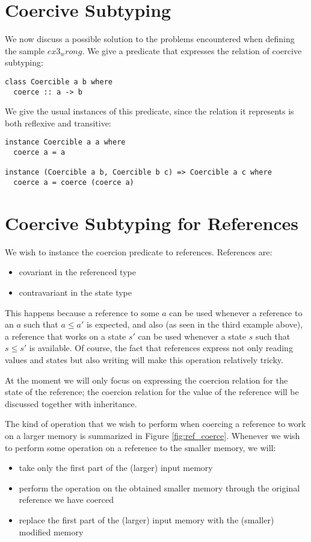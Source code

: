 \section{Coercive Subtyping}
We now discuss a possible solution to the problems encountered when defining the sample $ex3_wrong$. We give a predicate that expresses the relation of coercive subtyping:
\begin{lstlisting}
class Coercible a b where
  coerce :: a -> b
\end{lstlisting}

We give the usual instances of this predicate, since the relation it represents is both reflexive and transitive:
\begin{lstlisting}
instance Coercible a a where
  coerce a = a

instance (Coercible a b, Coercible b c) => Coercible a c where
  coerce a = coerce (coerce a)
\end{lstlisting}

\section{Coercive Subtyping for References}
We wish to instance the coercion predicate to references. References are:
\begin{itemize}
\item covariant in the referenced type
\item contravariant in the state type
\end{itemize}
This happens because a reference to some $a$ can be used whenever a reference to an $a$ such that $a \le a'$ is expected, and also (as seen in the third example above), a reference that works on a state $s'$ can be used whenever a state $s$ such that $s \le s'$ is available. Of course, the fact that references express not only reading values and states but also writing will make this operation relatively tricky.

At the moment we will only focus on expressing the coercion relation for the state of the reference; the coercion relation for the value of the reference will be discussed together with inheritance.

The kind of operation that we wish to perform when coercing a reference to work on a larger memory is summarized in Figure \ref{fig:ref_coerce}. Whenever we wish to perform some operation on a reference to the smaller memory, we will:
\begin{itemize}
\item take only the first part of the (larger) input memory 
\item perform the operation on the obtained smaller memory through the original reference we have coerced
\item replace the first part of the (larger) input memory with the (smaller) modified memory
\end{itemize}

